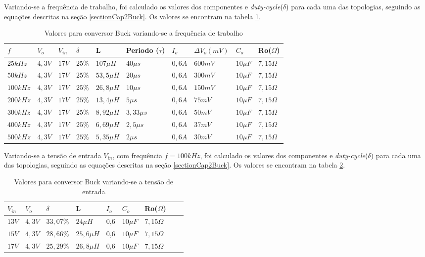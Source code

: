 \par Variando-se a frequência de trabalho, foi calculado os valores dos componentes e \textit{duty-cycle}($\delta$) para cada uma das topologias, seguindo as equações descritas na seção \ref{sectionCap2Buck}. Os valores se encontram na tabela \ref{t_VariacaoFrequencia}.

\begin{table}[H]
\centering
\caption{Valores para conversor Buck variando-se a frequência de trabalho}
\begin{tabular}{llllllllll}
\hline
$f$  &	$V_o$	& $V_{in}$ &	$\delta$	& L & Periodo ($\tau$)	& $I_o$	& $\Delta V_o (mV)$	& $C_o$ & 	Ro($\Omega$)  \\ \hline
$ 25kHz$	& $4,3V$	& $17V$	& $25\%$	& $107\mu H$	& $40 \mu s$& $0,6A$	& $600mV$	& $10\mu F$	& $7,15 \Omega$  \\
$ 50kHz$    & $4,3V$    & $17V$	& $25\%$	& $53,5\mu H$	& $20\mu s$	& $0,6A$	& $300mV$	& $10\mu F$	& $7,15 \Omega$  \\
$100kHz$	& $4,3V$	& $17V$	& $25\%$	& $26,8\mu H$	& $10\mu s$	& $0,6A$	& $150mV$	& $10\mu F$	& $7,15 \Omega$  \\
$200kHz$	& $4,3V$	& $17V$	& $25\%$	& $13,4\mu H$	& $5\mu s$	& $0,6A$	& $75mV$	& $10\mu F$	& $7,15 \Omega$  \\
$300kHz$	& $4,3V$	& $17V$	& $25\%$	& $8,92\mu H$	& $3,33\mu s$& $0,6A$	& $50mV$	& $10\mu F$	& $7,15 \Omega$  \\
$400kHz$	& $4,3V$	& $17V$	& $25\%$	& $6,69\mu H$	& $2,5\mu s$ & $0,6A$	& $37mV$	& $10\mu F$	& $7,15 \Omega$  \\
$500kHz$	& $4,3V$	& $17V$	& $25\%$	& $5,35\mu H$	& $2\mu s$	 & $0,6A$	& $30mV$	& $10\mu F$	& $7,15 \Omega$  \\ \hline
\end{tabular}
\label{t_VariacaoFrequencia}
\end{table}

\par Variando-se a tensão de entrada $V_{in}$, com frequência $f=100kHz$, foi calculado os valores dos componentes e \textit{duty-cycle}($\delta$) para cada uma das topologias, seguindo as equações descritas na seção \ref{sectionCap2Buck}. Os valores se encontram na tabela \ref{t_VariacaoTensao}.

\begin{table}[H]
\centering
\caption{Valores para conversor Buck variando-se a tensão de entrada}
\begin{tabular}{lllllllll}
\hline
$V_{in}$ &	$V_o$	& 	$\delta$ &	L &  $I_o$	& $C_o$ & 	Ro($\Omega$)  \\ \hline
$13V$	& $4,3V$ & $33,07\% $ &  $24\mu H$	& 0,6	& $10 \mu F$	& $7,15 \Omega$ \\
$15V$	& $4,3V$ & $28,66\% $ &  $25,6\mu H$	& 0,6	& $10 \mu F$	& $7,15 \Omega$ \\
$17V$	& $4,3V$ & $25,29\% $ &  $26,8\mu H$	& 0,6	& $10 \mu F$	& $7,15 \Omega$ \\ 
\hline
\end{tabular}
\label{t_VariacaoTensao}
\end{table}

